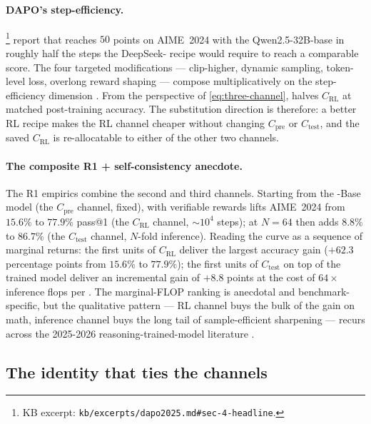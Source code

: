\paragraph{DAPO's step-efficiency.}
\citet[\S 4]{dapo2025}%
\footnote{KB excerpt: \texttt{kb/excerpts/dapo2025.md\#sec-4-headline}.}
report that  reaches $50$ points on AIME~2024 with the
Qwen2.5-32B-base in roughly half the  steps the DeepSeek-
recipe would require to reach a comparable score. The four targeted
modifications --- clip-higher, dynamic sampling, token-level loss,
overlong reward shaping --- compose multiplicatively on the
step-efficiency dimension \citep[\S 3]{dapo2025}. From the perspective
of \cref{eq:three-channel},  halves $C_\text{RL}$ at matched
post-training accuracy. The substitution direction is therefore: a
better RL recipe makes the RL channel cheaper without changing
$C_\text{pre}$ or $C_\text{test}$, and the saved $C_\text{RL}$ is
re-allocatable to either of the other two channels.

\paragraph{The composite R1 + self-consistency anecdote.} The R1
empirics combine the second and third channels. Starting from the
-Base model (the $C_\text{pre}$ channel, fixed),  with
verifiable rewards lifts AIME~2024 from $15.6\%$ to $77.9\%$ pass@1
(the $C_\text{RL}$ channel, $\sim\!10^{4}$  steps); 
at $N = 64$ then adds $8.8\%$ to $86.7\%$ (the $C_\text{test}$ channel,
$N$-fold inference). Reading the curve as a sequence of marginal
returns: the first units of $C_\text{RL}$ deliver the largest accuracy
gain ($+62.3$ percentage points from $15.6\%$ to $77.9\%$); the first
units of $C_\text{test}$ on top of the trained model deliver an
incremental gain of $+8.8$ points at the cost of $64\times$ inference
flops per . The marginal-FLOP ranking is anecdotal and
benchmark-specific, but the qualitative pattern --- RL channel buys
the bulk of the gain on math, inference channel buys the long tail of
sample-efficient sharpening --- recurs across the 2025-2026
reasoning-trained-model literature \citep[\S 2.3]{deepseek-r1}.

\subsection{The identity that ties the channels}
\label{sec:svr-identity}

